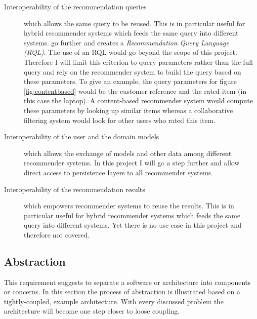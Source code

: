 \begin{description}
    \item[Interoperability of the recommendation queries] which allows the same query to be reused. This is in particular useful for hybrid recommender systems which feeds the same query into different systems. \citet{adomavicius05} go further and creates a \emph{Recommendation Query Language (RQL)}. The use of an RQL would go beyond the scope of this project. Therefore I will limit this criterion to query parameters rather than the full query and rely on the recommender system to build the query based on these parameters. To give an example, the query parameters for figure \ref{fig:contentbased} would be the customer reference and the rated item (in this case the laptop). A content-based recommender system would compute these parameters by looking up similar items whereas a collaborative filtering system would look for other users who rated this item.
    \item[Interoperability of the user and the domain models] which allows the exchange of models and other data among different recommender systems. In this project I will go a step further and allow direct access to persistence layers to all recommender systems.
    \item[Interoperability of the recommendation results] which empowers recommender systems to reuse the results. This is in particular useful for hybrid recommender systems which feeds the same query into different systems. Yet there is no use case in this project and therefore not covered.
\end{description}

\subsection{Abstraction}
\label{problem-abstraction}

This requirement suggests to separate a software or architecture into components or concerns. In this section the process of abstraction is illustrated based on a tightly-coupled, example architecture. With every discussed problem the architecture will become one step closer to loose coupling. 


